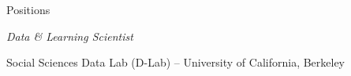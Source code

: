\begin{rubric}{Positions}

\entry*[2013--present] \emph{Data \& Learning Scientist}
\par Social Sciences Data Lab (D-Lab) -- University of California, Berkeley

\end{rubric}

